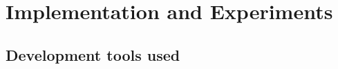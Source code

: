 \newpage
































































































\section{Implementation and Experiments}





\subsection{Development tools used}
